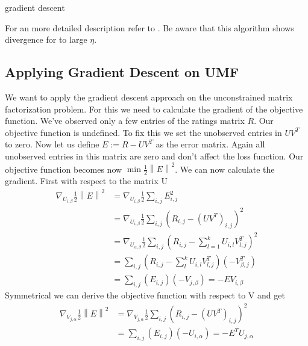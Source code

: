 \documentclass[DIV=14,twocolumn]{scrartcl}
\newcommand{\norm}[1]{\left\lVert#1\right\rVert}
\begin{document}
\begin{algorithm}
	\caption{gradient descent}
	\label{algo:gd}

\end{algorithm}
For an more detailed description refer to \cite{ShSh14}.
Be aware that this algorithm shows divergence for to large $\eta$. 


\subsection{Applying Gradient Descent on UMF} 
We want to apply the gradient descent approach on the unconstrained matrix factorization problem. For this we need to calculate the gradient of the objective function. We've observed only a few entries of the ratings matrix $R$. Our objective function is undefined. To fix this we set the unobserved entries in $UV^T$ to zero. 
Now let us define $E:=R-UV^T$ as the error matrix. Again all unobserved entries in this matrix are zero and don't affect the loss function. Our objective function becomes now $\min\frac{1}{2}\norm{E}^2$.
We can now calculate the gradient.
First with respect to the matrix U
\begin{equation*}
\begin{split}
\nabla_{U_{i,\beta}} \frac{1}{2}\norm{E}^2 &= \nabla_{U_{i,\beta}} \frac{1}{2}\sum_{i,j}E_{i,j}^2 \\ &=\nabla_{U_{i,\beta}} \frac{1}{2}\sum_{i,j}(R_{i,j}-(UV^T)_{i,j})^2 \\
&=\nabla_{U_{\alpha,\beta}} \frac{1}{2}\sum_{i,j}(R_{i,j}-\sum_{l=1}^k U_{i,l}V^T_{l,j})^2\\
&=\sum_{i,j}(R_{i,j}-\sum_{l}^k U_{i,l}V^T_{l,j})(-V^T_{\beta,j})\\
&=\sum_{i,j}(E_{i,j})(-V_{j,\beta})=-EV_{i,\beta} 
\end{split}
\end{equation*}
Symmetrical we can derive the objective function with respect to V and get 
\begin{equation*}
\begin{split}
\nabla_{V_{j,\alpha}} \frac{1}{2}\norm{E}^2 &= \nabla_{V_{j,\alpha}} \frac{1}{2}\sum_{i,j}(R_{i,j}-(UV^T)_{i,j})^2\\
&=\sum_{i,j}(E_{i,j})(-U_{i,\alpha})=-E^TU_{j,\alpha}
\end{split}
\end{equation*}
\end{document}
